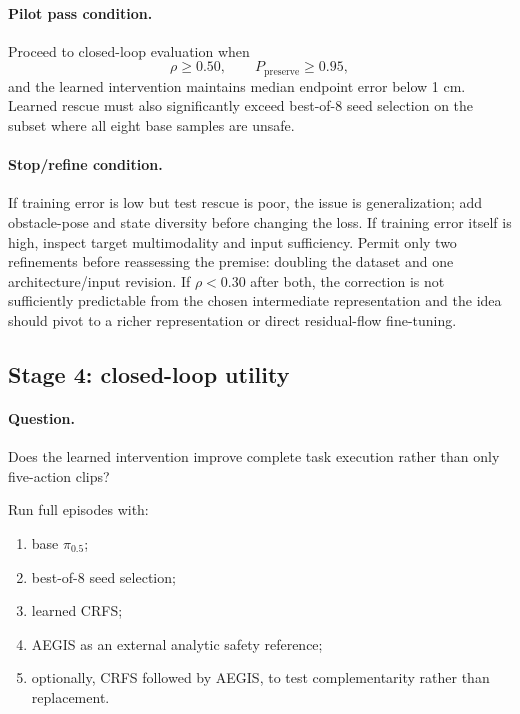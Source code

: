 \documentclass[10pt,conference]{IEEEtran}
\newcommand{\method}{\textsc{CRFS}}
\newcommand{\pizero}{\ensuremath{\pi_{0.5}}}
\newcommand{\1}{\mathbf{1}}
\begin{document}
\paragraph{Pilot pass condition.}
Proceed to closed-loop evaluation when
\begin{equation}
    \rho\geq 0.50,
    \qquad
    P_{\mathrm{preserve}}\geq 0.95,
\end{equation}
and the learned intervention maintains median endpoint error below 1 cm. Learned rescue must also significantly exceed best-of-$8$ seed selection on the subset where all eight base samples are unsafe.

\paragraph{Stop/refine condition.}
If training error is low but test rescue is poor, the issue is generalization; add obstacle-pose and state diversity before changing the loss. If training error itself is high, inspect target multimodality and input sufficiency. Permit only two refinements before reassessing the premise: doubling the dataset and one architecture/input revision. If $\rho<0.30$ after both, the correction is not sufficiently predictable from the chosen intermediate representation and the idea should pivot to a richer representation or direct residual-flow fine-tuning.

\subsection{Stage 4: closed-loop utility}

\paragraph{Question.} Does the learned intervention improve complete task execution rather than only five-action clips?

Run full episodes with:
\begin{enumerate}[leftmargin=*,nosep]
    \item base \pizero{};
    \item best-of-$8$ seed selection;
    \item learned \method{};
    \item AEGIS as an external analytic safety reference;
    \item optionally, \method{} followed by AEGIS, to test complementarity rather than replacement.
\end{enumerate}
\end{document}

